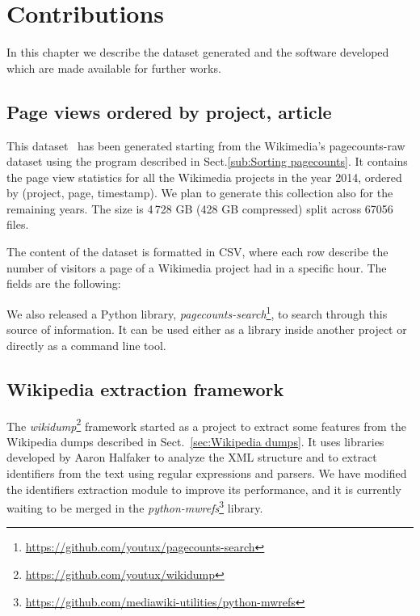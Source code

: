 
\chapter{Contributions}
\label{cha:Contributions}
In this chapter we describe the dataset generated and the software developed which are made available for further works.

\section{Page views ordered by project, article}
\label{sec:contrib_datasets_pagecounts}
This dataset~\cite{Bogon2016} has been generated starting from the Wikimedia's pagecounts-raw dataset using the program described in Sect.\ref{sub:Sorting pagecounts}.
It contains the page view statistics for all the Wikimedia projects in the year 2014, ordered by (project, page, timestamp).
We plan to generate this collection also for the remaining years.
The size is 4\,728 GB (428 GB compressed) split across 67056 files.

The content of the dataset is formatted in CSV, where each row describe the number of visitors a page of a Wikimedia project had in a specific hour.
The fields are the following:

We also released a Python library, \emph{pagecounts-search}\footnote{\url{https://github.com/youtux/pagecounts-search}}, to search through this source of information.
It can be used either as a library inside another project or directly as a command line tool.

\section{Wikipedia extraction framework}
\label{sub:contrib_programs_framework}
The \emph{wikidump}\footnote{\url{https://github.com/youtux/wikidump}} framework started as a project to extract some features from the Wikipedia dumps described in Sect.~\ref{sec:Wikipedia dumps}.
It uses libraries developed by Aaron Halfaker to analyze the XML structure and to extract identifiers from the text using regular expressions and parsers.
We have modified the identifiers extraction module to improve its performance, and it is currently waiting to be merged in the \emph{python-mwrefs}\footnote{\url{https://github.com/mediawiki-utilities/python-mwrefs}} library.

